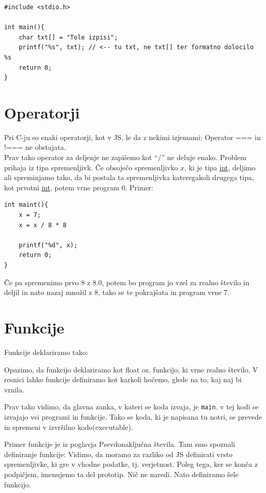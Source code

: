\documentclass[a4paper, 12pt]{article}
\begin{document}
\begin{lstlisting}
#include <stdio.h>

int main(){
	char txt[] = "Tole izpisi";
	printf("%s", txt); // <-- tu txt, ne txt[] ter formatno dolocilo %s
	return 0;
}
\end{lstlisting}

\section{Operatorji}
Pri C-ju so enaki operatorji, kot v JS, le da z nekimi izjemami: Operator === in !=== ne obstajata.\\
Prav tako operator za deljenje ne zapišemo kot ``/'' ne deluje enako. Problem prihaja iz tipa spremenljivk. Če obsoječo spremenljivko $x$, ki je tipa \underline{int}, deljimo ali spreminjamo tako, da bi postala ta spremenljivka kateregakoli drugega tipa, kot prvotni \underline{int}, potem vrne program 0. Primer:
\begin{lstlisting}
int maint(){	
	x = 7;
	x = x / 8 * 8
	
	printf("%d", x);
	return 0;
}
\end{lstlisting}
Če pa spremenimo prvo 8 z 8.0, potem bo program jo vzel za realno število in deljil in nato nazaj množil z 8, tako se te pokrajšata in program vrne 7.

\section{Funkcije}
Funkcije deklariramo tako:

\begin{center}
\end{center}

Opazimo, da funkcijo deklariramo kot float oz. funkcijo, ki vrne realno število. V resnici lahko funkcije definiramo kot karkoli hočemo, glede na to, kaj naj bi vrnila.

Prav tako vidimo, da glavna zanka, v kateri se koda izvaja, je \texttt{main}. v tej kodi se izvajajo vsi programi in funkcije. Tako se koda, ki je napisana tu notri, se prevede in spremeni v izvršilno kodo(executable).

Primer funkcije je iz poglavja Psevdonaključna števila. Tam smo spoznali definiranje funkcije:
 Vidimo, da moramo za razliko od JS definirati vrsto spremenljivke, ki gre v vhodne podatke, tj. verjetnost. Poleg tega, ker se konča z podpičjem, imenujemo ta del prototip. Nič ne naredi. Nato definiramo šele funkcijo.
\end{document}
